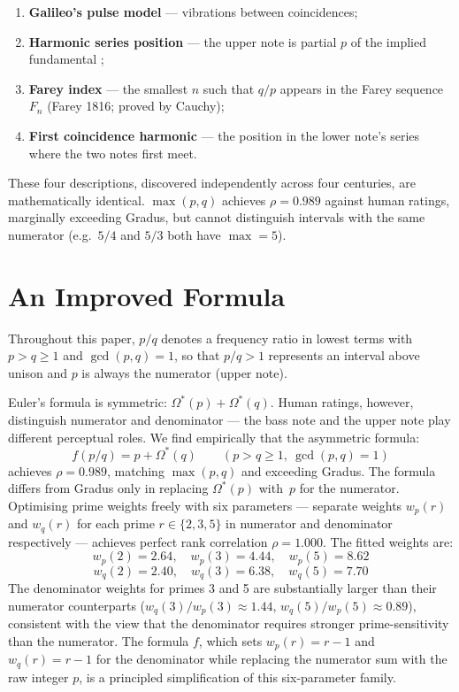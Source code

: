 \documentclass[11pt,a4paper]{article}
\newcommand{\Os}{\Omega^{*}}
\begin{document}
\begin{enumerate}
  \item \textbf{Galileo's pulse model} --- vibrations between coincidences;
  \item \textbf{Harmonic series position} --- the upper note is partial $p$ of
        the implied fundamental \cite{rameau1722};
  \item \textbf{Farey index} --- the smallest $n$ such that $q/p$ appears in
        the Farey sequence $F_n$ (Farey 1816; proved by Cauchy);
  \item \textbf{First coincidence harmonic} --- the position in the lower
        note's series where the two notes first meet.
\end{enumerate}

These four descriptions, discovered independently across four centuries, are
mathematically identical. $\max(p,q)$ achieves $\rho = 0.989$ against human
ratings, marginally exceeding Gradus, but cannot distinguish intervals with
the same numerator (e.g.\ $5/4$ and $5/3$ both have $\max = 5$).


\section{An Improved Formula}

Throughout this paper, $p/q$ denotes a frequency ratio in lowest terms with
$p > q \geq 1$ and $\gcd(p,q) = 1$, so that $p/q > 1$ represents an
interval above unison and $p$ is always the numerator (upper note).

Euler's formula is symmetric: $\Os(p) + \Os(q)$. Human ratings, however,
distinguish numerator and denominator --- the bass note and the upper note
play different perceptual roles. We find empirically that the asymmetric
formula:
\[
  \boxed{f(p/q) = p + \Os(q)} \qquad (p > q \geq 1,\ \gcd(p,q)=1)
\]
achieves $\rho = 0.989$, matching $\max(p,q)$ and exceeding Gradus. The
formula differs from Gradus only in replacing $\Os(p)$ with~$p$ for the
numerator. Optimising prime weights freely with six parameters --- separate
weights $w_p(r)$ and $w_q(r)$ for each prime $r \in \{2, 3, 5\}$ in
numerator and denominator respectively --- achieves perfect rank correlation
$\rho = 1.000$. The fitted weights are:
\[
  w_p(2) = 2.64,\quad w_p(3) = 4.44,\quad w_p(5) = 8.62
\]
\[
  w_q(2) = 2.40,\quad w_q(3) = 6.38,\quad w_q(5) = 7.70
\]
The denominator weights for primes 3 and 5 are substantially larger than
their numerator counterparts ($w_q(3)/w_p(3) \approx 1.44$,
$w_q(5)/w_p(5) \approx 0.89$), consistent with the view that the denominator
requires stronger prime-sensitivity than the numerator. The formula $f$, which
sets $w_p(r) = r - 1$ and $w_q(r) = r - 1$ for the denominator while
replacing the numerator sum with the raw integer $p$, is a principled
simplification of this six-parameter family.
\end{document}
